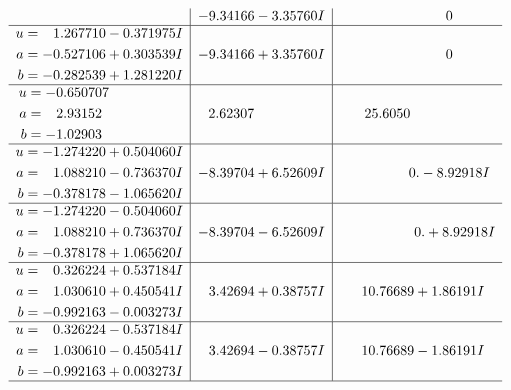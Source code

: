 \documentclass[1p]{elsarticle_modified}
\theoremstyle{definition}
\begin{document}
$$\begin{array}{c|c|c}
 & -9.34166 - 3.35760 I & \phantom{-0.000000 } 0 \\ \hline\begin{aligned}
u &= \phantom{-}1.267710 - 0.371975 I \\
a &= -0.527106 + 0.303539 I \\
b &= -0.282539 + 1.281220 I\end{aligned}
 & -9.34166 + 3.35760 I & \phantom{-0.000000 } 0 \\ \hline\begin{aligned}
u &= -0.650707\phantom{ +0.000000I} \\
a &= \phantom{-}2.93152\phantom{ +0.000000I} \\
b &= -1.02903\phantom{ +0.000000I}\end{aligned}
 & \phantom{-}2.62307\phantom{ +0.000000I} & \phantom{-}25.6050\phantom{ +0.000000I} \\ \hline\begin{aligned}
u &= -1.274220 + 0.504060 I \\
a &= \phantom{-}1.088210 - 0.736370 I \\
b &= -0.378178 - 1.065620 I\end{aligned}
 & -8.39704 + 6.52609 I & \phantom{-0.000000 } 0. - 8.92918 I \\ \hline\begin{aligned}
u &= -1.274220 - 0.504060 I \\
a &= \phantom{-}1.088210 + 0.736370 I \\
b &= -0.378178 + 1.065620 I\end{aligned}
 & -8.39704 - 6.52609 I & \phantom{-0.000000 -}0. + 8.92918 I \\ \hline\begin{aligned}
u &= \phantom{-}0.326224 + 0.537184 I \\
a &= \phantom{-}1.030610 + 0.450541 I \\
b &= -0.992163 - 0.003273 I\end{aligned}
 & \phantom{-}3.42694 + 0.38757 I & \phantom{-}10.76689 + 1.86191 I \\ \hline\begin{aligned}
u &= \phantom{-}0.326224 - 0.537184 I \\
a &= \phantom{-}1.030610 - 0.450541 I \\
b &= -0.992163 + 0.003273 I\end{aligned}
 & \phantom{-}3.42694 - 0.38757 I & \phantom{-}10.76689 - 1.86191 I\\
 \hline 
 \end{array}$$\newpage
\end{document}
